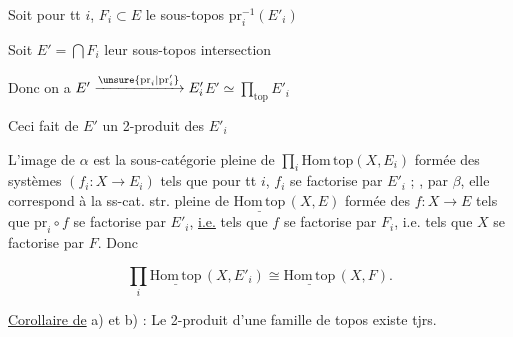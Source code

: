 Soit pour tt $i$, $F_i\subset E$ le sous-topos $\mathrm{pr}_i^{-1}(E'_i)$

Soit $E'=\bigcap F_i$ leur sous-topos intersection

Donc on a \qquad $E'\xrightarrow{\unsure{\mathrm{pr}_i|\mathrm{pr}'_i}}E'_i$\qquad $E'\simeq\prod_{\mathrm{top}}E'_i$

Ceci fait de $E'$ un 2-produit des $E'_i$


L'image  de $\alpha$ est la sous-catégorie  pleine de $\prod_i\mathrm{Hom\,top}(X,E_i)$ formée des systèmes $(f_i\colon X\longrightarrow E_i)$ tels que pour tt $i$, $f_i$ se factorise par $E'_i$ ;  ,  par $\beta$, elle correspond à la ss-cat. str. pleine de $\underline{\mathrm{Hom\,top}}\,(X,E)$ formée des $f\colon X\longrightarrow E$ tels que  $\mathrm{pr}_i\circ f$ se factorise par $E'_i$, \uline{i.e.} tels que  $f$ se factorise par $F_i$, i.e. tels que $X$ se factorise par $F$. Donc

\[
\prod_i\underline{\mathrm{Hom\,top}}\,(X,E'_i)\cong\underline{\mathrm{Hom\,top}}\,(X,F).
\]

\uline{Corollaire de} a) et b) : Le 2-produit d'une famille de topos existe tjrs.



